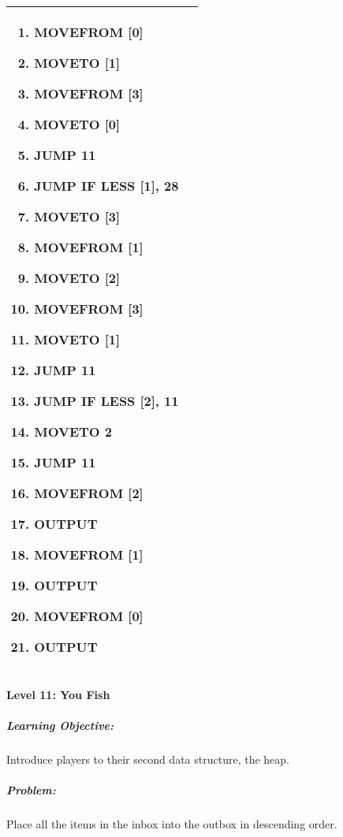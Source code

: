 \begin{center}
\begin{tabular}{ | m{5cm} | m{9cm} | }
\begin{enumerate}
                \item MOVEFROM [0]
                \item MOVETO [1]
                \item MOVEFROM [3]
                \item MOVETO [0]
                \item JUMP 11
                \item JUMP IF LESS [1], 28
                \item MOVETO [3]
                \item MOVEFROM [1]
                \item MOVETO [2]
                \item MOVEFROM [3]
                \item MOVETO [1]
                \item JUMP 11
                \item JUMP IF LESS [2], 11
                \item MOVETO 2
                \item JUMP 11
                \item MOVEFROM [2]
                \item OUTPUT
                \item MOVEFROM [1]
                \item OUTPUT
                \item MOVEFROM [0]
                \item OUTPUT
            \end{enumerate}
            \\
        \hline
    \end{tabular}
\end{center}

\paragraph{Level 11: You Fish}
\subparagraph{Learning Objective:} Introduce players to their second data structure, the heap.

\subparagraph{Problem:} Place all the items in the inbox into the outbox in descending order.

